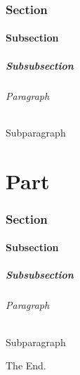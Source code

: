 \documentclass{article}
\begin{document}
    \section[SECTION!]{Section}
    \kant[6-10]

    \subsection[SUBSECTION!]{Subsection}
    \kant[11-15]

    \subsubsection[SUBSUBSECTION!]{Subsubsection}
    \kant[16-20]

    \paragraph[PARAGRAPH!]{Paragraph}
    \kant[21-25]
    
    \subparagraph[SUBPARAGRAPH!]{Subparagraph}
    \kant[21-25]

    \part[A]{Part}
    \kant[26-30]

    \section[B]{Section}
    \kant[31-35]

    \subsection[C]{Subsection}
    \kant[36-40]

    \subsubsection[D]{Subsubsection}
    \kant[41-45]

    \paragraph[E]{Paragraph}
    \kant[46-50]
    
    \subparagraph[F]{Subparagraph}
    \kant[51-55]

    The End.
    
    
\end{document}
